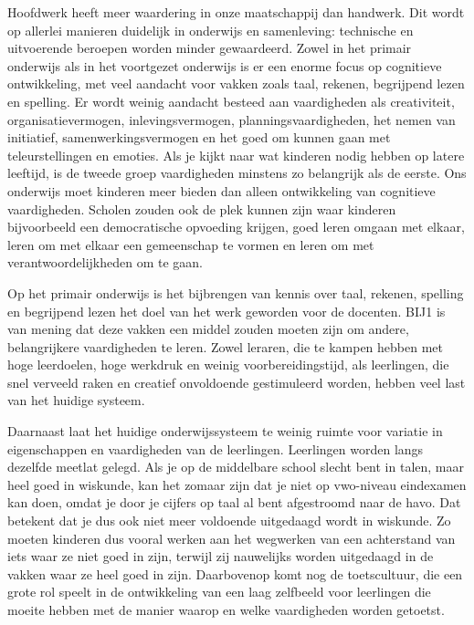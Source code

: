 Hoofdwerk heeft meer waardering in onze maatschappij dan handwerk. Dit
wordt op allerlei manieren duidelijk in onderwijs en samenleving:
technische en uitvoerende beroepen worden minder gewaardeerd. Zowel in
het primair onderwijs als in het voortgezet onderwijs is er een enorme
focus op cognitieve ontwikkeling, met veel aandacht voor vakken zoals
taal, rekenen, begrijpend lezen en spelling. Er wordt weinig aandacht
besteed aan vaardigheden als creativiteit, organisatievermogen,
inlevingsvermogen, planningsvaardigheden, het nemen van initiatief,
samenwerkingsvermogen en het goed om kunnen gaan met teleurstellingen en
emoties. Als je kijkt naar wat kinderen nodig hebben op latere leeftijd,
is de tweede groep vaardigheden minstens zo belangrijk als de eerste.
Ons onderwijs moet kinderen meer bieden dan alleen ontwikkeling van
cognitieve vaardigheden. Scholen zouden ook de plek kunnen zijn waar
kinderen bijvoorbeeld een democratische opvoeding krijgen, goed leren
omgaan met elkaar, leren om met elkaar een gemeenschap te vormen en
leren om met verantwoordelijkheden om te gaan.

Op het primair onderwijs is het bijbrengen van kennis over taal,
rekenen, spelling en begrijpend lezen het doel van het werk geworden
voor de docenten. BIJ1 is van mening dat deze vakken een middel zouden
moeten zijn om andere, belangrijkere vaardigheden te leren. Zowel
leraren, die te kampen hebben met hoge leerdoelen, hoge werkdruk en
weinig voorbereidingstijd, als leerlingen, die snel verveeld raken en
creatief onvoldoende gestimuleerd worden, hebben veel last van het
huidige systeem.

Daarnaast laat het huidige onderwijssysteem te weinig ruimte voor
variatie in eigenschappen en vaardigheden van de leerlingen. Leerlingen
worden langs dezelfde meetlat gelegd. Als je op de middelbare school
slecht bent in talen, maar heel goed in wiskunde, kan het zomaar zijn
dat je niet op vwo-niveau eindexamen kan doen, omdat je door je cijfers
op taal al bent afgestroomd naar de havo. Dat betekent dat je dus ook
niet meer voldoende uitgedaagd wordt in wiskunde. Zo moeten kinderen dus
vooral werken aan het wegwerken van een achterstand van iets waar ze
niet goed in zijn, terwijl zij nauwelijks worden uitgedaagd in de vakken
waar ze heel goed in zijn. Daarbovenop komt nog de toetscultuur, die een
grote rol speelt in de ontwikkeling van een laag zelfbeeld voor
leerlingen die moeite hebben met de manier waarop en welke vaardigheden
worden getoetst.

